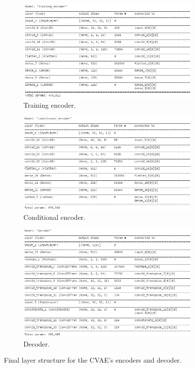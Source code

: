 \documentclass{l4proj}
\begin{document}
\begin{figure}[H]
    \centering
    \begin{subfigure}[b]{0.49\textwidth}
        \includegraphics[width=\textwidth]{images/TrainingEncoder.PNG}
        \caption{Training encoder.}
    \end{subfigure}
    \begin{subfigure}[b]{0.49\textwidth}
        \includegraphics[width=\textwidth]{images/ConditionalEncoder.PNG}
        \caption{Conditional encoder.}
    \end{subfigure} 
    \begin{subfigure}[b]{0.49\textwidth}
        \includegraphics[width=\textwidth]{images/Decoder.PNG}
        \caption{Decoder.}
    \end{subfigure} 
    \caption{Final layer structure for the CVAE's encoders and decoder.}
    \label{fig:cvae_model}
\end{figure}
\end{document}
